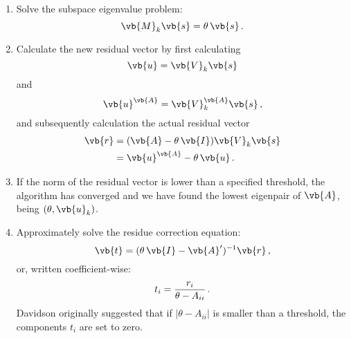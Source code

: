\begin{enumerate}
            \item Solve the subspace eigenvalue problem:
                \begin{equation}
                    \vb{M}_k \vb{s} = \theta \thinspace \vb{s} \thinspace .
                \end{equation}

            \item Calculate the new residual vector by first calculating
                \begin{equation}
                    \vb{u} = \vb{V}_k \vb{s}
                \end{equation}
                and
                \begin{equation}
                    \vb{u}^{\vb{A}} = \vb{V}_k^{\vb{A}} \vb{s} \thinspace ,
                \end{equation}
                and subsequently calculation the actual residual vector
                \begin{align}
                    \vb{r} &= (\vb{A} - \theta \thinspace \vb{I}) \vb{V}_k \vb{s} \\
                    &= \vb{u}^{\vb{A}} - \theta \thinspace \vb{u} \thinspace .
                \end{align}

            \item If the norm of the residual vector is lower than a specified threshold, the algorithm has converged and we have found the lowest eigenpair of $\vb{A}$, being $(\theta, \vb{u}_k)$.

            \item Approximately solve the residue correction equation:
                \begin{equation}
                    \vb{t} = (\theta \thinspace \vb{I} - \vb{A}')^{-1} \vb{r} \thinspace ,
                \end{equation}
                or, written coefficient-wise:
                \begin{equation}
                    t_i = \frac{r_i}{\theta - A_{ii}} \thinspace .
                \end{equation}
                Davidson originally suggested that if $|\theta - A_{ii}|$ is smaller than a threshold, the components $t_i$ are set to zero.
        \end{enumerate}

